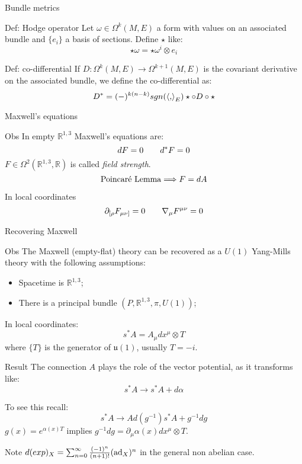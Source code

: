 \documentclass{beamer}
\begin{document}
\begin{frame}{Bundle metrics}
	\begin{exampleblock}{Def: Hodge operator}
		Let $\omega\in\Omega^k(M,E)$ a form with values on an associated bundle and $\{e_i\}$ a basis of sections. Define $\star$ like:
		$$\star\omega=\star\omega^i\otimes e_i$$
	\end{exampleblock}
	\begin{exampleblock}{Def: co-differential}
		If $D:\Omega^k(M,E)\rightarrow\Omega^{k+1}(M,E)$ is the covariant derivative on the associated bundle, we define the co-differential as:
		$$D^*=(-)^{k(n-k)}sgn(\braket{,}_E)\star\circ D\circ\star$$
	\end{exampleblock}
\end{frame}
\begin{frame}{Maxwell's equations}
	\begin{exampleblock}{Obs}
		In empty $\mathbb{R}^{1,3}$ Maxwell's equations are:
		$$dF=0\hspace{20 pt} d^*F=0$$ 
		$F\in\Omega^2(\mathbb{R}^{1,3},\mathbb{R})$ is called \textit{field strength}.
		$$\hbox{Poincaré Lemma}\Longrightarrow F=dA$$
	\end{exampleblock}
	\begin{block}{In local coordinates}
		$$\partial_{[\rho} F_{\mu\nu]}=0\hspace{20 pt} \nabla_\mu F^{\mu\nu}=0$$
	\end{block}
\end{frame}
\begin{frame}{Recovering Maxwell}
	\begin{exampleblock}{Obs}
		The Maxwell (empty-flat) theory can be recovered as a $U(1)$ Yang-Mills theory with the following assumptions:
		\begin{itemize}
			\item Spacetime is $\mathbb{R}^{1,3}$;
			\item There is a principal bundle $(P,\mathbb{R}^{1,3},\pi,U(1))$;
		\end{itemize}
	\end{exampleblock}
	In local coordinates: $$s^*A=A_{\mu}dx^\mu\otimes T$$
	where $\{T\}$ is the generator of $\mathfrak{u}(1)$, usually $T=-i$.
\end{frame}
\begin{frame}
	\begin{block}{Result}
		The connection $A$ plays the role of the vector potential, as it transforms like:
		$$s^*A\rightarrow s^*A+d\alpha$$
	\end{block}
	To see this recall:
	$$s^*A\rightarrow Ad(g^{-1})s^*A+g^{-1}dg$$
	$g(x)=e^{\alpha(x) T}$ implies $g^{-1}dg=\partial_\mu \alpha(x)dx^\mu\otimes T$.
	\begin{alertblock}{Note}
		$d(exp)_X=\sum_{n=0}^{\infty}{(-1)^n\over (n+1)!}(\hbox{ad}_X)^n$ in the general non abelian case.
	\end{alertblock}
\end{frame}
\end{document}
